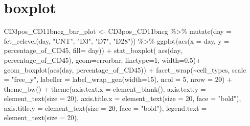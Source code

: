 \documentclass[
]{book}
\newenvironment{Shaded}{\begin{snugshade}}{\end{snugshade}}
\newcommand{\AttributeTok}[1]{\textcolor[rgb]{0.77,0.63,0.00}{#1}}
\newcommand{\DecValTok}[1]{\textcolor[rgb]{0.00,0.00,0.81}{#1}}
\newcommand{\FloatTok}[1]{\textcolor[rgb]{0.00,0.00,0.81}{#1}}
\newcommand{\FunctionTok}[1]{\textcolor[rgb]{0.00,0.00,0.00}{#1}}
\newcommand{\NormalTok}[1]{#1}
\newcommand{\OtherTok}[1]{\textcolor[rgb]{0.56,0.35,0.01}{#1}}
\newcommand{\SpecialCharTok}[1]{\textcolor[rgb]{0.00,0.00,0.00}{#1}}
\newcommand{\StringTok}[1]{\textcolor[rgb]{0.31,0.60,0.02}{#1}}
\begin{document}
\hypertarget{boxplot}{%
\section{boxplot}\label{boxplot}}

\begin{Shaded}
\begin{Highlighting}[]
\NormalTok{CD3pos\_CD11bneg\_bar\_plot }\OtherTok{\textless{}{-}}\NormalTok{ CD3pos\_CD11bneg }\SpecialCharTok{\%\textgreater{}\%}
\FunctionTok{mutate}\NormalTok{(}\AttributeTok{day =} \FunctionTok{fct\_relevel}\NormalTok{(day,}
            \StringTok{"CNT"}\NormalTok{, }\StringTok{"D3"}\NormalTok{, }\StringTok{"D7"}\NormalTok{,}
            \StringTok{"D28"}\NormalTok{)) }\SpecialCharTok{\%\textgreater{}\%}
  \FunctionTok{ggplot}\NormalTok{(}\FunctionTok{aes}\NormalTok{(}\AttributeTok{x =}\NormalTok{ day, }\AttributeTok{y =}\NormalTok{ percentage\_of\_CD45, }\AttributeTok{fill=}\NormalTok{ day)) }\SpecialCharTok{+}
  \FunctionTok{stat\_boxplot}\NormalTok{( }\FunctionTok{aes}\NormalTok{(day, percentage\_of\_CD45), }
    \AttributeTok{geom=}\StringTok{\textquotesingle{}errorbar\textquotesingle{}}\NormalTok{, }\AttributeTok{linetype=}\DecValTok{1}\NormalTok{, }\AttributeTok{width=}\FloatTok{0.5}\NormalTok{)}\SpecialCharTok{+}  
  \FunctionTok{geom\_boxplot}\NormalTok{(}\FunctionTok{aes}\NormalTok{(day, percentage\_of\_CD45)) }\SpecialCharTok{+} 
  \FunctionTok{facet\_wrap}\NormalTok{(}\SpecialCharTok{\textasciitilde{}}\NormalTok{cell\_types, }\AttributeTok{scale =} \StringTok{"free\_y"}\NormalTok{, }\AttributeTok{labeller =} \FunctionTok{label\_wrap\_gen}\NormalTok{(}\AttributeTok{width=}\DecValTok{15}\NormalTok{), }\AttributeTok{ncol =} \DecValTok{5}\NormalTok{, }\AttributeTok{nrow =} \DecValTok{20}\NormalTok{) }\SpecialCharTok{+} 
  \FunctionTok{theme\_bw}\NormalTok{() }\SpecialCharTok{+} 
  \FunctionTok{theme}\NormalTok{(}\AttributeTok{axis.text.x =} \FunctionTok{element\_blank}\NormalTok{(), }\AttributeTok{axis.text.y =} \FunctionTok{element\_text}\NormalTok{(}\AttributeTok{size =} \DecValTok{20}\NormalTok{), }
        \AttributeTok{axis.title.x =} \FunctionTok{element\_text}\NormalTok{(}\AttributeTok{size =} \DecValTok{20}\NormalTok{, }\AttributeTok{face =} \StringTok{"bold"}\NormalTok{), }
        \AttributeTok{axis.title.y =} \FunctionTok{element\_text}\NormalTok{(}\AttributeTok{size =} \DecValTok{20}\NormalTok{, }\AttributeTok{face =} \StringTok{"bold"}\NormalTok{), }
        \AttributeTok{legend.text =} \FunctionTok{element\_text}\NormalTok{(}\AttributeTok{size =} \DecValTok{20}\NormalTok{), }

\end{Highlighting}
\end{Shaded}
\end{document}
